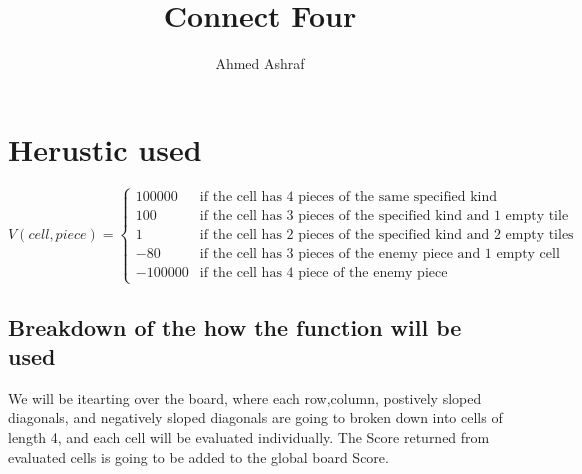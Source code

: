 \documentclass{article}
\title{Connect Four}
\author{Ahmed Ashraf}
\date{}
\begin{document}
\maketitle

\section{Herustic used}
 {
  \scriptsize
  \begin{equation*}
      V(cell,piece) = \begin{cases}
          100000  & \text{if the cell has 4 pieces of the same specified kind}              \\
          100     & \text{if the cell has 3 pieces of the specified kind and 1 empty tile}  \\
          1       & \text{if the cell has 2 pieces of the specified kind and 2 empty tiles} \\
          -80     & \text{if the cell has 3 pieces of the enemy piece and 1 empty cell}     \\
          -100000 & \text{if the cell has 4 piece of the enemy piece}
      \end{cases}
  \end{equation*}
 }

\subsection{Breakdown of the how the function will be used}
We will be itearting over the board, where each row,column, postively sloped diagonals, and negatively sloped diagonals are going to broken down into cells of length 4, and each cell will be evaluated individually. The Score returned from evaluated cells is going to be added to the global board Score.
\end{document}
